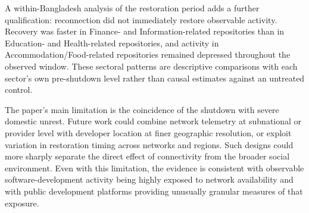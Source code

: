 A within-Bangladesh analysis of the restoration period adds a further qualification: reconnection did not immediately restore observable activity. Recovery was faster in Finance- and Information-related repositories than in Education- and Health-related repositories, and activity in Accommodation/Food-related repositories remained depressed throughout the observed window. These sectoral patterns are descriptive comparisons with each sector's own pre-shutdown level rather than causal estimates against an untreated control.

The paper's main limitation is the coincidence of the shutdown with severe domestic unrest. Future work could combine network telemetry at subnational or provider level with developer location at finer geographic resolution, or exploit variation in restoration timing across networks and regions. Such designs could more sharply separate the direct effect of connectivity from the broader social environment. Even with this limitation, the evidence is consistent with observable software-development activity being highly exposed to network availability and with public development platforms providing unusually granular measures of that exposure.
